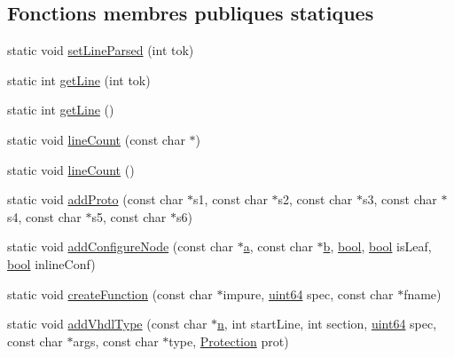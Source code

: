 \subsection*{Fonctions membres publiques statiques}
\begin{DoxyCompactItemize}
\item 
static void \hyperlink{classvhdl_1_1parser_1_1_vhdl_parser_a73e994c04b955d5c5122d48a4e7fdd51}{set\+Line\+Parsed} (int tok)
\item 
static int \hyperlink{classvhdl_1_1parser_1_1_vhdl_parser_ac59b8eac337e599dc32452cb11bff7ca}{get\+Line} (int tok)
\item 
static int \hyperlink{classvhdl_1_1parser_1_1_vhdl_parser_a2fe9d70295a62b37b4aff5408776fdd1}{get\+Line} ()
\item 
static void \hyperlink{classvhdl_1_1parser_1_1_vhdl_parser_aec128c05f48607993ff8a3bb2e508c54}{line\+Count} (const char $\ast$)
\item 
static void \hyperlink{classvhdl_1_1parser_1_1_vhdl_parser_a451b9d6f21914e123c5e8ac13a849bdd}{line\+Count} ()
\item 
static void \hyperlink{classvhdl_1_1parser_1_1_vhdl_parser_a98d18490d8b901905709d8ccb95af60f}{add\+Proto} (const char $\ast$s1, const char $\ast$s2, const char $\ast$s3, const char $\ast$s4, const char $\ast$s5, const char $\ast$s6)
\item 
static void \hyperlink{classvhdl_1_1parser_1_1_vhdl_parser_a79b459f023dca7b723ca0117ed263c12}{add\+Configure\+Node} (const char $\ast$\hyperlink{060__command__switch_8tcl_ab08ae027fc5777bc4f0629f1b60b35db}{a}, const char $\ast$\hyperlink{060__command__switch_8tcl_a68bdb74c144118d936931c46f75d4b3e}{b}, \hyperlink{qglobal_8h_a1062901a7428fdd9c7f180f5e01ea056}{bool}, \hyperlink{qglobal_8h_a1062901a7428fdd9c7f180f5e01ea056}{bool} is\+Leaf, \hyperlink{qglobal_8h_a1062901a7428fdd9c7f180f5e01ea056}{bool} inline\+Conf)
\item 
static void \hyperlink{classvhdl_1_1parser_1_1_vhdl_parser_a65e0853e6ea999f574192a7116b3c923}{create\+Function} (const char $\ast$impure, \hyperlink{classvhdl_1_1parser_1_1_vhdl_parser_a95f5e79c79601054e289aadc9bafa413}{uint64} spec, const char $\ast$fname)
\item 
static void \hyperlink{classvhdl_1_1parser_1_1_vhdl_parser_aba39936f741bf015f084aa5b94c3e533}{add\+Vhdl\+Type} (const char $\ast$\hyperlink{060__command__switch_8tcl_acdde3cd86eb2421ce8dbb2e85227d368}{n}, int start\+Line, int section, \hyperlink{classvhdl_1_1parser_1_1_vhdl_parser_a95f5e79c79601054e289aadc9bafa413}{uint64} spec, const char $\ast$args, const char $\ast$type, \hyperlink{types_8h_a90e352184df58cd09455fe9996cd4ded}{Protection} prot)

\end{DoxyCompactItemize}
